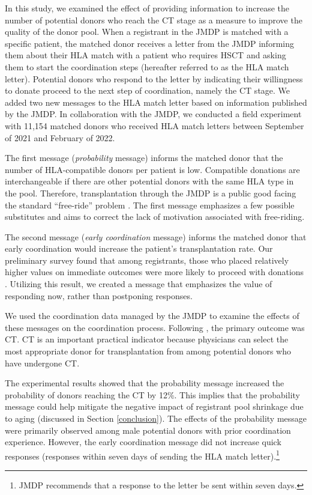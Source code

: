 \documentclass[12pt, a4paper]{article}
\begin{document}
In this study, we examined the effect of providing information to increase the number of potential donors who reach the CT stage as a measure to improve the quality of the donor pool. When a registrant in the JMDP is matched with a specific patient, the matched donor receives a letter from the JMDP informing them about their HLA match with a patient who requires HSCT and asking them to start the coordination steps (hereafter referred to as the HLA match letter). Potential donors who respond to the letter by indicating their willingness to donate proceed to the next step of coordination, namely the CT stage. We added two new messages to the HLA match letter based on information published by the JMDP. In collaboration with the JMDP, we conducted a field experiment with 11,154 matched donors who received HLA match letters between September of 2021 and February of 2022.

The first message (\emph{probability} message) informs the matched donor that the number of HLA-compatible donors per patient is low. Compatible donations are interchangeable if there are other potential donors with the same HLA type in the pool. Therefore, transplantation through the JMDP is a public good facing the standard ``free-ride'' problem \citep{Bergstrom2009}. The first message emphasizes a few possible substitutes and aims to correct the lack of motivation associated with free-riding.

The second message (\emph{early coordination} message) informs the matched donor that early coordination would increase the patient's transplantation rate. Our preliminary survey found that among registrants, those who placed relatively higher values on immediate outcomes were more likely to proceed with donations \citep{Ohtake2020}. Utilizing this result, we created a message that emphasizes the value of responding now, rather than postponing responses.

We used the coordination data managed by the JMDP to examine the effects of these messages on the coordination process. Following \citet{Haylock2024}, the primary outcome was CT. CT is an important practical indicator because physicians can select the most appropriate donor for transplantation from among potential donors who have undergone CT.

The experimental results showed that the probability message increased the probability of donors reaching the CT by 12\%. This implies that the probability message could help mitigate the negative impact of registrant pool shrinkage due to aging (discussed in Section \ref{conclusion}). The effects of the probability message were primarily observed among male potential donors with prior coordination experience. However, the early coordination message did not increase quick responses (responses within seven days of sending the HLA match letter).\footnote{JMDP recommends that a response to the letter be sent within seven days.}
\end{document}
